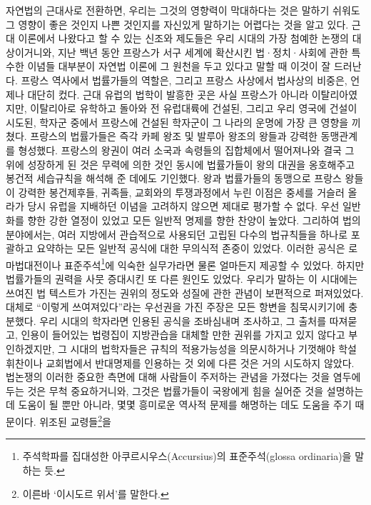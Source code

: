 자연법의 근대사로 전환하면, 우리는 그것의 영향력이 막대하다는 것은
말하기 쉬워도 그 영향이 좋은 것인지 나쁜 것인지를 자신있게
말하기는 어렵다는 것을 알고 있다.
근대  이론에서 나왔다고 할 수 있는 신조와 제도들은
우리 시대의 가장 첨예한 논쟁의 대상이거니와,
지난 백년 동안 프랑스가 서구 세계에 확산시킨 법^^b7정치^^b7사회에 관한
특수한 이념들 대부분이 자연법 이론에 그 원천을 두고 있다고 말할 때
이것이 잘 드러난다.
프랑스 역사에서 법률가들의 역할은,
그리고 프랑스 사상에서 법사상의 비중은,
언제나 대단히 컸다.
근대 유럽의 법학이 발흥한 곳은 사실 프랑스가 아니라 이탈리아였지만,
이탈리아로 유학하고 돌아와 전 유럽대륙에 건설된,
그리고  우리 영국에 건설이 시도된,
학자군 중에서 프랑스에 건설된 학자군이 그 나라의 운명에 가장 큰
영향을 끼쳤다.
프랑스의 법률가들은 즉각 카페 왕조 및 발루아 왕조의 왕들과
강력한 동맹관계를 형성했다.
프랑스의 왕권이 여러 소국과 속령들의 집합체에서 떨어져나와
결국 그 위에 성장하게 된 것은 무력에 의한 것인 동시에
법률가들이 왕의 대권을 옹호해주고 봉건적 세습규칙을 해석해 준 데에도 기인했다.
왕과 법률가들의 동맹으로 프랑스 왕들이
강력한 봉건제후들, 귀족들, 교회와의 투쟁과정에서 누린 이점은
중세를 거슬러 올라가 당시 유럽을 지배하던 이념을 고려하지 않으면
제대로 평가할 수 없다.
우선 일반화를 향한 강한 열정이 있었고 모든 일반적 명제를 향한 찬양이 높았다.
그리하여 법의 분야에서는, 여러 지방에서 관습적으로 사용되던 고립된
다수의 법규칙들을 하나로
포괄하고 요약하는 모든 일반적 공식에 대한 무의식적 존중이 있었다.
이러한 공식은 로마법대전이나 표준주석\footnote{%
  주석학파를 집대성한
  아쿠르시우스(Accursius)의 표준주석(glossa ordinaria)을 말하는 듯.}에
익숙한 실무가라면 물론 얼마든지 제공할 수 있었다.
하지만 법률가들의 권력을 사뭇 증대시킨 또 다른 원인도 있었다.
우리가 말하는 이 시대에는 쓰여진 법 텍스트가 가진는 권위의 정도와 성질에 관한
관념이 보편적으로 퍼져있었다.
대체로 ``이렇게 쓰여져있다''라는 우선권을 가진
주장은 모든 항변을 침묵시키기에 충분했다.
우리 시대의 학자라면 인용된 공식을 조바심내며 조사하고,
그 출처를 따져묻고,  인용이 들어있는 법령집이
지방관습을 대체할 만한 권위를 가지고 있지 않다고 부인하겠지만,
그 시대의 법학자들은 규칙의 적용가능성을 의문시하거나
기껏해야 학설휘찬이나 교회법에서 반대명제를 인용하는 것 외에
다른 것은 거의 시도하지 않았다.
법논쟁의 이러한 중요한 측면에 대해 사람들이 주저하는 관념을 가졌다는 것을
염두에 두는 것은 무척 중요하거니와,
그것은 법률가들이 국왕에게 힘을 실어준 것을 설명하는 데 도움이 될 뿐만 아니라,
몇몇 흥미로운 역사적 문제를 해명하는 데도 도움을 주기 때문이다.
위조된 교령들\footnote{%
  이른바 `이시도르 위서'를 말한다.}을
